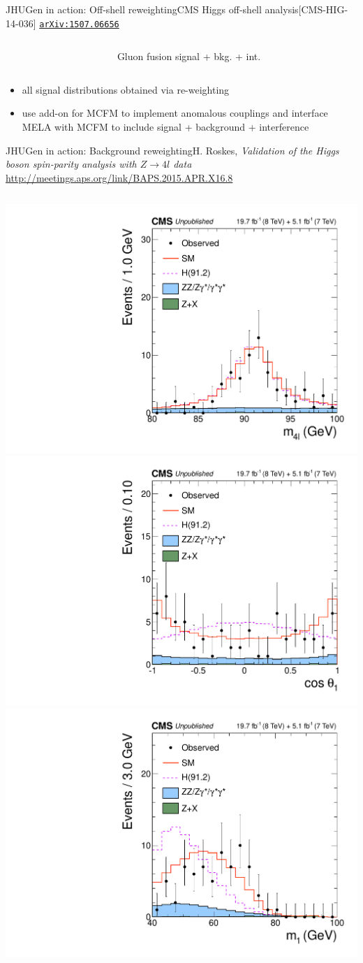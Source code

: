 \documentclass[usenames,dvipsnames,svgnames,table]{beamer}
\newcommand{\arxiv}[1]{\href{http://arxiv.org/abs/#1}{\nolinkurl{arXiv:#1}}}
\begin{document}
\begin{frame}{JHUGen in action: Off-shell reweighting}{CMS Higgs off-shell analysis\hfill [CMS-HIG-14-036] \arxiv{1507.06656}}
\begin{columns}
\begin{column}{0.75\textwidth}
\end{column}
\begin{column}{0.15\textwidth}
Gluon fusion signal + bkg. + int.
\end{column}
\end{columns}
\begin{itemize} \footnotesize
\item all signal distributions obtained via re-weighting
\item use add-on for MCFM to implement anomalous couplings and interface MELA with MCFM to include signal + background + interference
\end{itemize}
\end{frame}

\begin{frame}{JHUGen in action: Background reweighting}{H. Roskes, \emph{Validation of the Higgs boson spin-parity
analysis with $Z\to 4l$ data}\\ \url{http://meetings.aps.org/link/BAPS.2015.APR.X16.8}}
\begin{columns}
\begin{column}{0.55\textwidth}
\includegraphics[width=.5\columnwidth]{HVV/Z4lmH}
\includegraphics[width=.5\columnwidth]{HVV/Z4lcostheta1} \\
\includegraphics[width=.5\columnwidth]{HVV/Z4lm1}

\end{column}
\end{columns}
\end{frame}
\end{document}
